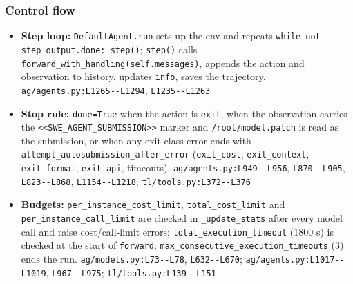 \subsubsection*{Control flow}
\begin{itemize}
\item \textbf{Step loop:} \texttt{DefaultAgent.\allowbreak{}run} sets up the env and repeats \texttt{while not step\_\allowbreak{}output.\allowbreak{}done:\allowbreak{} step(\allowbreak{})}; \texttt{step(\allowbreak{})} calls \texttt{forward\_\allowbreak{}with\_\allowbreak{}handling(\allowbreak{}self.\allowbreak{}messages)}, appends the action and observation to history, updates \texttt{info}, saves the trajectory. \texttt{ag/\allowbreak{}agents.\allowbreak{}py:\allowbreak{}L1265-\allowbreak{}-\allowbreak{}L1294}, \texttt{L1235-\allowbreak{}-\allowbreak{}L1263}
\item \textbf{Stop rule:} \texttt{done=True} when the action is \texttt{exit}, when the observation carries the \texttt{<<SWE\_\allowbreak{}AGENT\_\allowbreak{}SUBMISSION>>} marker and \texttt{/\allowbreak{}root/\allowbreak{}model.\allowbreak{}patch} is read as the submission, or when any exit-class error ends with \texttt{attempt\_\allowbreak{}autosubmission\_\allowbreak{}after\_\allowbreak{}error} (\texttt{exit\_\allowbreak{}cost}, \texttt{exit\_\allowbreak{}context}, \texttt{exit\_\allowbreak{}format}, \texttt{exit\_\allowbreak{}api}, timeouts). \texttt{ag/\allowbreak{}agents.\allowbreak{}py:\allowbreak{}L949-\allowbreak{}-\allowbreak{}L956}, \texttt{L870-\allowbreak{}-\allowbreak{}L905}, \texttt{L823-\allowbreak{}-\allowbreak{}L868}, \texttt{L1154-\allowbreak{}-\allowbreak{}L1218}; \texttt{tl/\allowbreak{}tools.\allowbreak{}py:\allowbreak{}L372-\allowbreak{}-\allowbreak{}L376}
\item \textbf{Budgets:} \texttt{per\_\allowbreak{}instance\_\allowbreak{}cost\_\allowbreak{}limit}, \texttt{total\_\allowbreak{}cost\_\allowbreak{}limit} and \texttt{per\_\allowbreak{}instance\_\allowbreak{}call\_\allowbreak{}limit} are checked in \texttt{\_\allowbreak{}update\_\allowbreak{}stats} after every model call and raise cost/call-limit errors; \texttt{total\_\allowbreak{}execution\_\allowbreak{}timeout} (1800 s) is checked at the start of \texttt{forward}; \texttt{max\_\allowbreak{}consecutive\_\allowbreak{}execution\_\allowbreak{}timeouts} (3) ends the run. \texttt{ag/\allowbreak{}models.\allowbreak{}py:\allowbreak{}L73-\allowbreak{}-\allowbreak{}L78}, \texttt{L632-\allowbreak{}-\allowbreak{}L670}; \texttt{ag/\allowbreak{}agents.\allowbreak{}py:\allowbreak{}L1017-\allowbreak{}-\allowbreak{}L1019}, \texttt{L967-\allowbreak{}-\allowbreak{}L975}; \texttt{tl/\allowbreak{}tools.\allowbreak{}py:\allowbreak{}L139-\allowbreak{}-\allowbreak{}L151}

\end{itemize}
